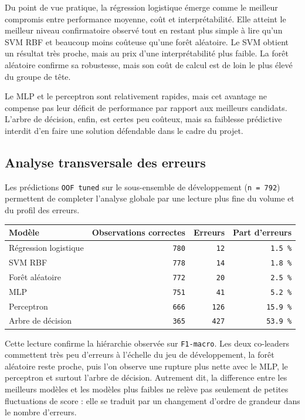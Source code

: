 Du point de vue pratique, la régression logistique émerge comme le meilleur compromis entre performance moyenne, coût et interprétabilité. Elle atteint le meilleur niveau confirmatoire observé tout en restant plus simple à lire qu'un SVM RBF et beaucoup moins coûteuse qu'une forêt aléatoire. Le SVM obtient un résultat très proche, mais au prix d'une interprétabilité plus faible. La forêt aléatoire confirme sa robustesse, mais son coût de calcul est de loin le plus élevé du groupe de tête.

Le MLP et le perceptron sont relativement rapides, mais cet avantage ne compense pas leur déficit de performance par rapport aux meilleurs candidats. L'arbre de décision, enfin, est certes peu coûteux, mais sa faiblesse prédictive interdit d'en faire une solution défendable dans le cadre du projet.

\subsection{Analyse transversale des erreurs}
Les prédictions \texttt{OOF tuned} sur le sous-ensemble de développement (\texttt{n = 792}) permettent de completer l'analyse globale par une lecture plus fine du volume et du profil des erreurs.

\begin{table}[H]
\centering
\begin{tabular}{|l|r|r|r|}
\hline
\textbf{Modèle} & \textbf{Observations correctes} & \textbf{Erreurs} & \textbf{Part d'erreurs} \\
\hline
Régression logistique & \texttt{780} & \texttt{12} & \texttt{1.5 \%} \\
SVM RBF & \texttt{778} & \texttt{14} & \texttt{1.8 \%} \\
Forêt aléatoire & \texttt{772} & \texttt{20} & \texttt{2.5 \%} \\
MLP & \texttt{751} & \texttt{41} & \texttt{5.2 \%} \\
Perceptron & \texttt{666} & \texttt{126} & \texttt{15.9 \%} \\
Arbre de décision & \texttt{365} & \texttt{427} & \texttt{53.9 \%} \\
\hline
\end{tabular}
\end{table}

Cette lecture confirme la hiérarchie observée sur \texttt{F1-macro}. Les deux co-leaders commettent très peu d'erreurs à l'échelle du jeu de développement, la forêt aléatoire reste proche, puis l'on observe une rupture plus nette avec le MLP, le perceptron et surtout l'arbre de décision. Autrement dit, la difference entre les meilleurs modèles et les modèles plus faibles ne relève pas seulement de petites fluctuations de score : elle se traduit par un changement d'ordre de grandeur dans le nombre d'erreurs.

